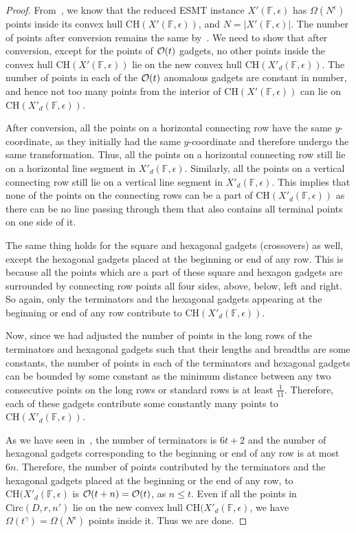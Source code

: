 \begin{proof}
    From~, we know that the reduced ESMT instance $X'(\mathbb{F},\epsilon)$ has $\Omega(N^\epsilon)$ points inside its convex hull $\mathrm{CH}(X'(\mathbb{F},\epsilon))$, and $N = |X'(\mathbb{F},\epsilon)|$. The number of points after conversion remains the same by~. We need to show that after conversion, except for the points of $\mathcal{O}(t)$ gadgets, no other points inside the convex hull $\mathrm{CH}(X'(\mathbb{F},\epsilon))$ lie on the new convex hull $\mathrm{CH}(X'_{d}(\mathbb{F},\epsilon))$. The number of points in each of the $\mathcal{O}(t)$ anomalous gadgets are constant in number, and hence not too many points from the interior of $\mathrm{CH}(X'(\mathbb{F},\epsilon))$ can lie on $\mathrm{CH}(X'_{d}(\mathbb{F},\epsilon))$. 
    
    After conversion, all the points on a horizontal connecting row have the same $y$-coordinate, as they initially had the same $y$-coordinate and therefore undergo the same transformation. Thus, all the points on a horizontal connecting row still lie on a horizontal line segment in $X'_{d}(\mathbb{F},\epsilon)$. Similarly, all the points on a vertical connecting row still lie on a vertical line segment in $X'_{d}(\mathbb{F},\epsilon)$. This implies that none of the points on the connecting rows can be a part of $\mathrm{CH}(X'_{d}(\mathbb{F},\epsilon))$ as there can be no line passing through them that also contains all terminal points on one side of it. 

    The same thing holds for the square and hexagonal gadgets (crossovers) as well, except the hexagonal gadgets placed at the beginning or end of any row. This is because all the points which are a part of these square and hexagon gadgets are surrounded by connecting row points all four sides, above, below, left and right. So again, only the terminators and the hexagonal gadgets appearing at the beginning or end of any row contribute to $\mathrm{CH}(X'_{d}(\mathbb{F},\epsilon))$.

    Now, since we had adjusted the number of points in the long rows of the terminators and hexagonal gadgets such that their lengths and breadths are some constants, the number of points in each of the terminators and hexagonal gadgets can be bounded by some constant as the minimum distance between any two consecutive points on the long rows or standard rows is at least $\frac{1}{11}$. Therefore, each of these gadgets contribute some constantly many points to $\mathrm{CH}(X'_{d}(\mathbb{F},\epsilon))$.
    
    As we have seen in~, the number of terminators is $6t+2$ and the number of hexagonal gadgets corresponding to the beginning or end of any row is at most $6n$. Therefore, the number of points contributed by the terminators and the hexagonal gadgets placed at the beginning or the end of any row, to $\mathrm{CH}(X'_{d}(\mathbb{F},\epsilon)$ is $\mathcal{O}(t+n) = \mathcal{O}(t)$, as $n \leq t$. Even if all the points in $\mathrm{Circ}(D,r,n')$ lie on the new convex hull $\mathrm{CH}(X'_{d}(\mathbb{F},\epsilon)$, we have $\Omega(t^\gamma) = \Omega(N^\epsilon)$ points inside it. Thus we are done.
\end{proof}

